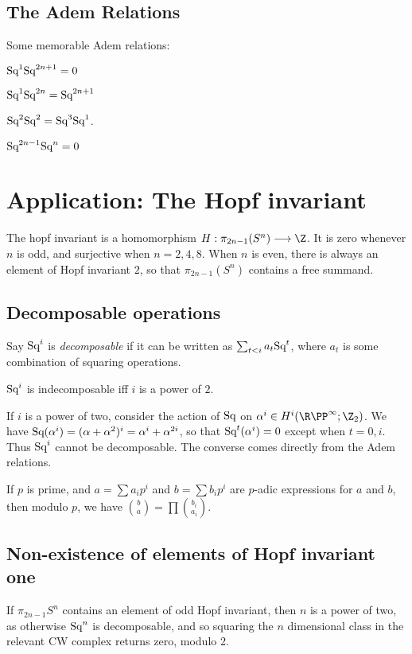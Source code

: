 \documentclass[11pt]{article}
\begin{document}
{\subsection{The Adem Relations}
Some memorable Adem relations:
\begin{itemise}
\item $\textup{Sq}^1\textup{Sq}^{2n+1}=0$
\item $\textup{Sq}^1\textup{Sq}^{2n}=\textup{Sq}^{2n+1}$
\item $\textup{Sq}^2\textup{Sq}^2=\textup{Sq}^3\textup{Sq}^1$.
\item $\textup{Sq}^{2n-1}\textup{Sq}^{n}=0$
\end{itemise}
\section{Application: The Hopf invariant}
The hopf invariant is a homomorphism $H:\pi_{2n-1}(S^n)\to\Z$. It is zero whenever $n$ is odd, and surjective when $n=2,4,8$. When $n$ is even, there is always an element of Hopf invariant $2$, so that $\pi_{2n-1}(S^n)$ contains a free summand.
\setcounter{subsection}{1}
\subsection{Decomposable operations}
Say $\textup{Sq}^i$ is \emph{decomposable} if it can be written as $\sum_{t<i}a_t\textup{Sq}^t$, where $a_t$ is some combination of squaring operations.
\begin{thm*}
$\textup{Sq}^i$ is indecomposable iff $i$ is a power of $2$.
\end{thm*}
If $i$ is a power of two, consider the action of $\textup{Sq}$ on $\alpha^i\in H^i(\RP^\infty;\Z_2)$. We have $\textup{Sq}(\alpha^i)=(\alpha+\alpha^2)^i=\alpha^i+\alpha^{2i}$, so that $\textup{Sq}^t(\alpha^i)=0$ except when $t=0,i$. Thus $\textup{Sq}^i$ cannot be decomposable. The converse comes directly from the Adem relations.
\begin{lem*}
If $p$ is prime, and $a=\sum a_ip^i$ and $b=\sum b_ip^i$ are $p$-adic expressions for $a$ and $b$, then modulo $p$, we have $\binom{b}{a}=\prod\binom{b_i}{a_i}$.
\end{lem*}
\subsection{Non-existence of elements of Hopf invariant one}
If $\pi_{2n-1}S^n$ contains an element of odd Hopf invariant, then $n$ is a power of two, as otherwise $\textup{Sq}^n$ is decomposable, and so squaring the $n$ dimensional class in the relevant CW complex returns zero, modulo 2.

}
\end{document}
